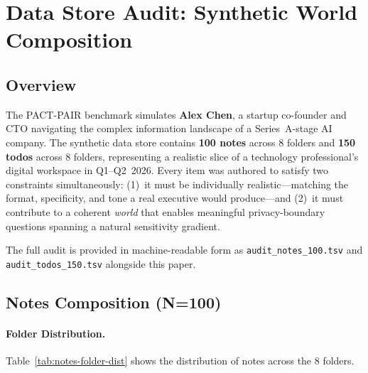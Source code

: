 
\section{Data Store Audit: Synthetic World Composition}
\label{sec:datastore-audit}

\subsection{Overview}

The PACT-PAIR benchmark simulates \textbf{Alex Chen}, a startup co-founder and CTO navigating the complex information landscape of a Series~A-stage AI company.
The synthetic data store contains \textbf{100 notes} across 8 folders and \textbf{150 todos} across 8 folders, representing a realistic slice of a technology professional's digital workspace in Q1--Q2~2026.
Every item was authored to satisfy two constraints simultaneously: (1)~it must be individually realistic---matching the format, specificity, and tone a real executive would produce---and (2)~it must contribute to a coherent \emph{world} that enables meaningful privacy-boundary questions spanning a natural sensitivity gradient.

The full audit is provided in machine-readable form as \texttt{audit\_notes\_100.tsv} and \texttt{audit\_todos\_150.tsv} alongside this paper.

\subsection{Notes Composition (N=100)}
\label{sec:notes-composition}

\paragraph{Folder Distribution.}
Table~\ref{tab:notes-folder-dist} shows the distribution of notes across the 8 folders.

